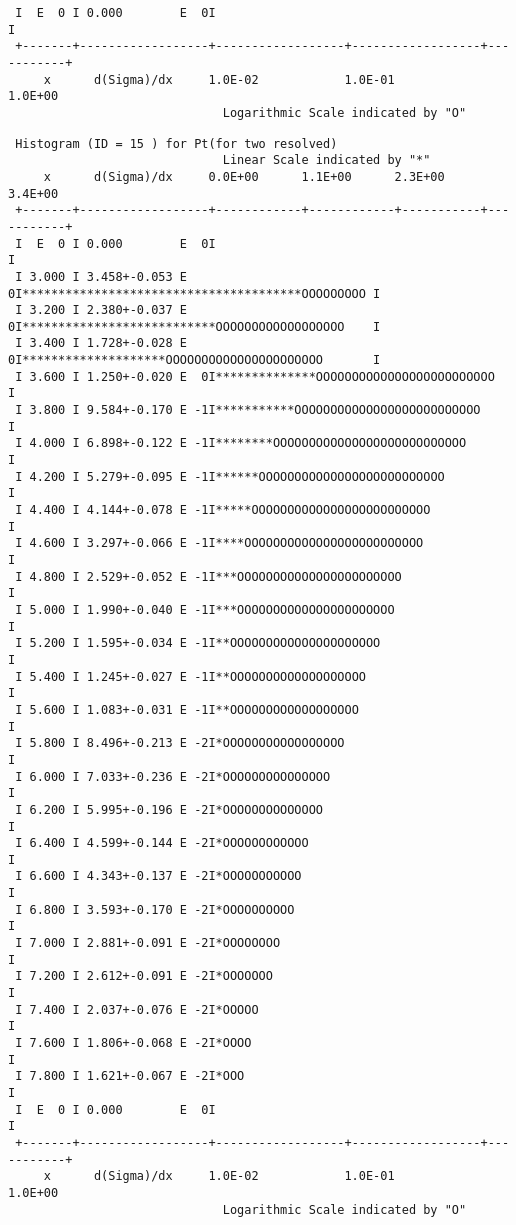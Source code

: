 \begin{small}
\begin{verbatim}
 I  E  0 I 0.000        E  0I                                                 I
 +-------+------------------+------------------+------------------+-----------+
     x      d(Sigma)/dx     1.0E-02            1.0E-01            1.0E+00      
                              Logarithmic Scale indicated by "O"
\end{verbatim}
\newpage
\begin{verbatim}  
 Histogram (ID = 15 ) for Pt(for two resolved)                                            
                              Linear Scale indicated by "*"
     x      d(Sigma)/dx     0.0E+00      1.1E+00      2.3E+00     3.4E+00      
 +-------+------------------+------------+------------+-----------+-----------+
 I  E  0 I 0.000        E  0I                                                 I
 I 3.000 I 3.458+-0.053 E  0I***************************************OOOOOOOOO I
 I 3.200 I 2.380+-0.037 E  0I***************************OOOOOOOOOOOOOOOOOO    I
 I 3.400 I 1.728+-0.028 E  0I********************OOOOOOOOOOOOOOOOOOOOOO       I
 I 3.600 I 1.250+-0.020 E  0I**************OOOOOOOOOOOOOOOOOOOOOOOOO          I
 I 3.800 I 9.584+-0.170 E -1I***********OOOOOOOOOOOOOOOOOOOOOOOOOO            I
 I 4.000 I 6.898+-0.122 E -1I********OOOOOOOOOOOOOOOOOOOOOOOOOOO              I
 I 4.200 I 5.279+-0.095 E -1I******OOOOOOOOOOOOOOOOOOOOOOOOOO                 I
 I 4.400 I 4.144+-0.078 E -1I*****OOOOOOOOOOOOOOOOOOOOOOOOO                   I
 I 4.600 I 3.297+-0.066 E -1I****OOOOOOOOOOOOOOOOOOOOOOOOO                    I
 I 4.800 I 2.529+-0.052 E -1I***OOOOOOOOOOOOOOOOOOOOOOO                       I
 I 5.000 I 1.990+-0.040 E -1I***OOOOOOOOOOOOOOOOOOOOOO                        I
 I 5.200 I 1.595+-0.034 E -1I**OOOOOOOOOOOOOOOOOOOOO                          I
 I 5.400 I 1.245+-0.027 E -1I**OOOOOOOOOOOOOOOOOOO                            I
 I 5.600 I 1.083+-0.031 E -1I**OOOOOOOOOOOOOOOOOO                             I
 I 5.800 I 8.496+-0.213 E -2I*OOOOOOOOOOOOOOOOO                               I
 I 6.000 I 7.033+-0.236 E -2I*OOOOOOOOOOOOOOO                                 I
 I 6.200 I 5.995+-0.196 E -2I*OOOOOOOOOOOOOO                                  I
 I 6.400 I 4.599+-0.144 E -2I*OOOOOOOOOOOO                                    I
 I 6.600 I 4.343+-0.137 E -2I*OOOOOOOOOOO                                     I
 I 6.800 I 3.593+-0.170 E -2I*OOOOOOOOOO                                      I
 I 7.000 I 2.881+-0.091 E -2I*OOOOOOOO                                        I
 I 7.200 I 2.612+-0.091 E -2I*OOOOOOO                                         I
 I 7.400 I 2.037+-0.076 E -2I*OOOOO                                           I
 I 7.600 I 1.806+-0.068 E -2I*OOOO                                            I
 I 7.800 I 1.621+-0.067 E -2I*OOO                                             I
 I  E  0 I 0.000        E  0I                                                 I
 +-------+------------------+------------------+------------------+-----------+
     x      d(Sigma)/dx     1.0E-02            1.0E-01            1.0E+00      
                              Logarithmic Scale indicated by "O"
\end{verbatim}
\end{small}

